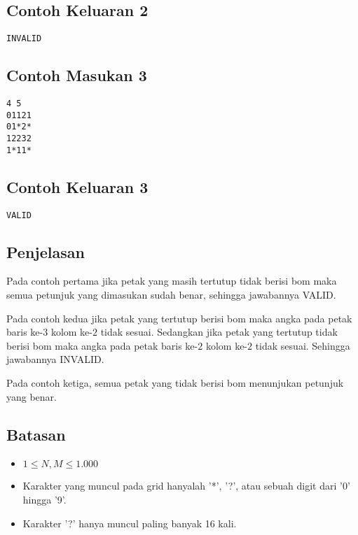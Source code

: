 \documentclass{article}
\begin{document}
\subsection*{Contoh Keluaran 2}
\begin{lstlisting}
INVALID
\end{lstlisting}


\subsection*{Contoh Masukan 3}
\begin{lstlisting}
4 5
01121
01*2*
12232
1*11*
\end{lstlisting}
\subsection*{Contoh Keluaran 3}
\begin{lstlisting}
VALID
\end{lstlisting}

\subsection*{Penjelasan}
\par\noindent
Pada contoh pertama jika petak yang masih tertutup tidak berisi bom maka semua petunjuk yang dimasukan sudah benar, sehingga jawabannya VALID.
\newline
\par\noindent
Pada contoh kedua jika petak yang tertutup berisi bom maka angka pada petak baris ke-$3$ kolom ke-$2$ tidak sesuai. Sedangkan jika petak yang tertutup tidak berisi bom maka angka pada petak baris ke-$2$ kolom ke-$2$ tidak sesuai. Sehingga jawabannya INVALID.
\newline
\par\noindent
Pada contoh ketiga, semua petak yang tidak berisi bom menunjukan petunjuk yang benar.


\subsection*{Batasan}

\begin{itemize}
	\item $1 \leq N, M \leq 1.000$
    \item Karakter yang muncul pada grid hanyalah '*', '?', atau sebuah digit dari '0' hingga '9'.
    \item Karakter '?' hanya muncul paling banyak 16 kali.
\end{itemize}
\end{document}
